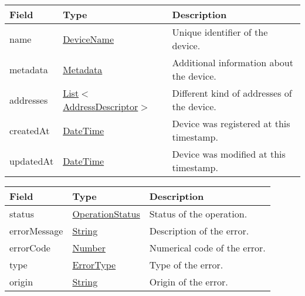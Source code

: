 \documentclass[a4paper]{arrowhead}
\newcommand{\pref}[1]{{\textcolor{ArrowheadGrey}{\hyperref[sec:model:primitives:#1]{#1}}}}
\begin{document}
 
\begin{table}[ht!]
\begin{tabularx}{\textwidth}{| p{4.25cm} | p{4cm} | X |} \hline
\rowcolor{gray!33} Field & Type      & Description \\ \hline
name & \pref{DeviceName} & Unique identifier of the device. \\ \hline
metadata & \hyperref[sec:model:Metadata]{Metadata} & Additional information about the device. \\ \hline
addresses &  \pref{List}$<$\hyperref[sec:model:AddressDescriptor]{AddressDescriptor}$>$ & Different kind of addresses of the device.  \\ \hline
createdAt & \pref{DateTime} & Device was registered at this timestamp. \\ \hline
updatedAt & \pref{DateTime} & Device was modified at this timestamp. \\ \hline
\end{tabularx}
\end{table}


\begin{table}[ht!]
\begin{tabularx}{\textwidth}{| p{4.25cm} | p{3.5cm} | X |} \hline
\rowcolor{gray!33} Field & Type      & Description \\ \hline
status & \pref{OperationStatus} & Status of the operation. \\ \hline
errorMessage & \pref{String} & Description of the error. \\ \hline
errorCode &\pref{Number}  & Numerical code of the error. \\ \hline
type & \pref{ErrorType} & Type of the error. \\ \hline
origin & \pref{String} & Origin of the error. \\ \hline
\end{tabularx}
\end{table}

\end{document}
